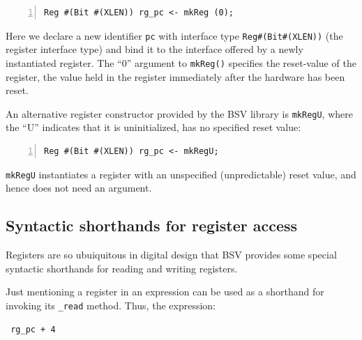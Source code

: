 
{\small
\begin{Verbatim}[frame=single, numbers=left]
    Reg #(Bit #(XLEN)) rg_pc <- mkReg (0);
\end{Verbatim}
}

Here we declare a new identifier \verb|pc| with interface type
\verb|Reg#(Bit#(XLEN))| (the register interface type) and bind it to
the interface offered by a newly instantiated register.  The ``0''
argument to \verb|mkReg()| specifies the reset-value of the register,
{\ie} the value held in the register immediately after the hardware
has been reset.

An alternative register constructor provided by the BSV library is
{\tt mkRegU}, where the ``U'' indicates that it is uninitialized,
{\ie} has no specified reset value:


{\small
\begin{Verbatim}[frame=single, numbers=left]
   Reg #(Bit #(XLEN)) rg_pc <- mkRegU;
\end{Verbatim}
}

\verb|mkRegU| instantiates a register with an unspecified
(unpredictable) reset value, and hence does not need an argument.


\subsection{Syntactic shorthands for register access}

\label{Sec_Register_syntactic_shorthands}


Registers are so ubuiquitous in digital design that BSV provides some
special syntactic shorthands for reading and writing registers.

Just mentioning a register in an expression can be used as a shorthand
for invoking its \verb|_read| method.  Thus, the expression:

\begin{tabbing}\small\tt
\hmmmm  rg\_pc + 4
\end{tabbing}

